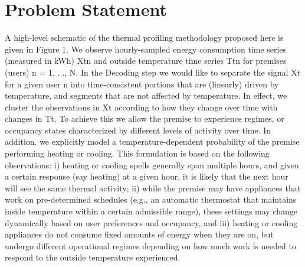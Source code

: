 \documentclass{sig-alternate}
\begin{document}
\section{Problem Statement}
A high-level schematic of the thermal
proﬁling methodology proposed here is given in Figure
1. We observe hourly-sampled energy consumption time
series (measured in kWh) {Xt}n and outside temperature
time series {Tt}n for premises (users) n = 1, ..., N. In the
Decoding step we would like to separate the signal {Xt} for
a given user n into time-consistent portions that are (linearly)
driven by temperature, and segments that are not affected by
temperature. In effect, we cluster the observations in {Xt}
according to how they change over time with changes in
{Tt}. To achieve this we allow the premise to experience
regimes, or occupancy states characterized by different
levels of activity over time. In addition, we explicitly model a
temperature-dependent probability of the premise performing
heating or cooling. This formulation is based on the following
observations: i) heating or cooling spells generally span
multiple hours, and given a certain response (say heating) at
a given hour, it is likely that the next hour will see the same
thermal activity; ii) while the premise may have appliances
that work on pre-determined schedules (e.g., an automatic
thermostat that maintains inside temperature within a certain
admissible range), these settings may change dynamically
based on user preferences and occupancy, and iii) heating or
cooling appliances do not consume ﬁxed amounts of energy
when they are on, but undergo different operational regimes
depending on how much work is needed to respond to the
outside temperature experienced.
\end{document}
